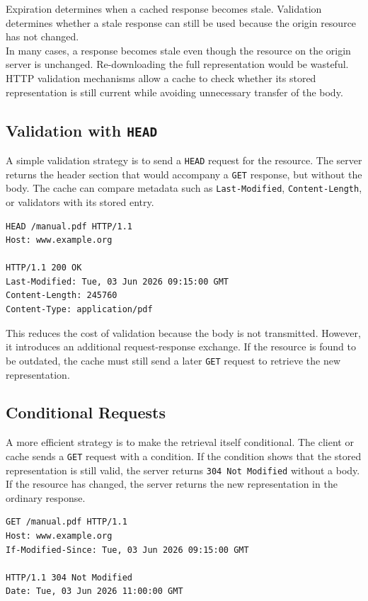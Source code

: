 \documentclass{scrbook}
\begin{document}
Expiration determines when a cached response becomes stale. Validation determines whether a stale response can still be used because the origin resource has not changed.\\

In many cases, a response becomes stale even though the resource on the origin server is unchanged. Re-downloading the full representation would be wasteful. HTTP validation mechanisms allow a cache to check whether its stored representation is still current while avoiding unnecessary transfer of the body.

\subsection{Validation with \texttt{HEAD}}

A simple validation strategy is to send a \texttt{HEAD} request for the resource. The server returns the header section that would accompany a \texttt{GET} response, but without the body. The cache can compare metadata such as \texttt{Last-Modified}, \texttt{Content-Length}, or validators with its stored entry.

\begin{lstlisting}
HEAD /manual.pdf HTTP/1.1
Host: www.example.org

HTTP/1.1 200 OK
Last-Modified: Tue, 03 Jun 2026 09:15:00 GMT
Content-Length: 245760
Content-Type: application/pdf
\end{lstlisting}

This reduces the cost of validation because the body is not transmitted. However, it introduces an additional request-response exchange. If the resource is found to be outdated, the cache must still send a later \texttt{GET} request to retrieve the new representation.

\subsection{Conditional Requests}

A more efficient strategy is to make the retrieval itself conditional. The client or cache sends a \texttt{GET} request with a condition. If the condition shows that the stored representation is still valid, the server returns \texttt{304 Not Modified} without a body. If the resource has changed, the server returns the new representation in the ordinary response.

\begin{lstlisting}
GET /manual.pdf HTTP/1.1
Host: www.example.org
If-Modified-Since: Tue, 03 Jun 2026 09:15:00 GMT

HTTP/1.1 304 Not Modified
Date: Tue, 03 Jun 2026 11:00:00 GMT
\end{lstlisting}
\end{document}
